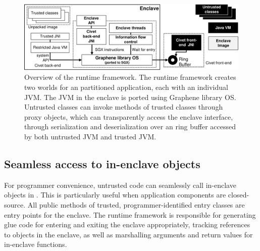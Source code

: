 
\begin{figure}[t!]
\centering
\includegraphics[width=6in]{civet/figures/civet-structure.pdf}
\caption[Overview of the \sysname{} runtime framework]
{Overview of the \sysname{} runtime framework.
The \sysname{} runtime framework creates two worlds for an partitioned \java{} application, each with an individual JVM.
The JVM in the enclave is ported using Graphene library OS.
Untrusted classes can invoke methods of trusted classes through proxy objects,
which can transparently access the enclave interface, through serialization
and deserialization over an ring buffer accessed by both untrusted JVM and trusted JVM. }
\label{fig:civet:runtime}
\end{figure}


\subsection{Seamless access to in-enclave objects}
\label{sec:civet:concept:interface}

For programmer convenience, 
untrusted code can seamlessly call in-enclave objects in \sysname{}.
This is particularly useful when application components are closed-source.
All public methods of trusted, programmer-identified entry classes are entry points for the enclave.
The \sysname{} runtime framework is responsible for generating glue code for entering and exiting
the enclave appropriately, tracking references to objects in the enclave, 
as well as marshalling arguments and return values for in-enclave functions.

